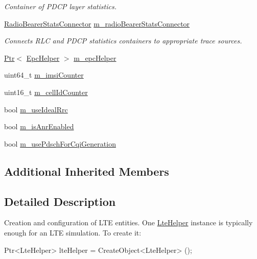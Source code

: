 \begin{DoxyCompactItemize}
\begin{DoxyCompactList}\small\item\em Container of P\+D\+CP layer statistics. \end{DoxyCompactList}\item 
\hyperlink{classns3_1_1RadioBearerStatsConnector}{Radio\+Bearer\+Stats\+Connector} \hyperlink{classns3_1_1LteHelper_a9150dda8d0a04d3fd72b48cd906ad864}{m\+\_\+radio\+Bearer\+Stats\+Connector}
\begin{DoxyCompactList}\small\item\em Connects R\+LC and P\+D\+CP statistics containers to appropriate trace sources. \end{DoxyCompactList}\item 
\hyperlink{classns3_1_1Ptr}{Ptr}$<$ \hyperlink{classns3_1_1EpcHelper}{Epc\+Helper} $>$ \hyperlink{classns3_1_1LteHelper_aeec42671d76d5bd719b37d77bfd27633}{m\+\_\+epc\+Helper}
\item 
uint64\+\_\+t \hyperlink{classns3_1_1LteHelper_acd9bb1a78fa9f3648ec5eb17ad07029c}{m\+\_\+imsi\+Counter}
\item 
uint16\+\_\+t \hyperlink{classns3_1_1LteHelper_a60f0f5feb3d9c6ac2e175f126c1ef4d4}{m\+\_\+cell\+Id\+Counter}
\item 
bool \hyperlink{classns3_1_1LteHelper_ab230ddf0db292c4ea6482e80bac0d53a}{m\+\_\+use\+Ideal\+Rrc}
\item 
bool \hyperlink{classns3_1_1LteHelper_a7ea3223dfc520265e1c8423b55b9ab18}{m\+\_\+is\+Anr\+Enabled}
\item 
bool \hyperlink{classns3_1_1LteHelper_abbc3c36de95dcca35d9516c7882104f6}{m\+\_\+use\+Pdsch\+For\+Cqi\+Generation}
\end{DoxyCompactItemize}
\subsection*{Additional Inherited Members}


\subsection{Detailed Description}
Creation and configuration of L\+TE entities. One \hyperlink{classns3_1_1LteHelper}{Lte\+Helper} instance is typically enough for an L\+TE simulation. To create it\+: \begin{DoxyVerb}Ptr<LteHelper> lteHelper = CreateObject<LteHelper> ();
\end{DoxyVerb}


